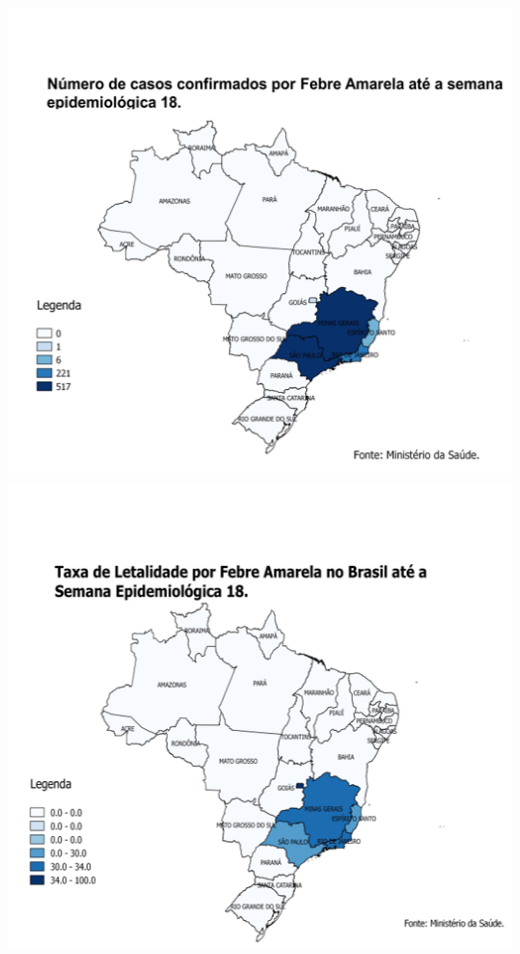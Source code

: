 \documentclass{article}
\begin{document}
\includegraphics[width=.4\textwidth]{img_altera_2.png}%
\includegraphics[width=.4\textwidth]{img_altera_3.png}%
\end{document}
